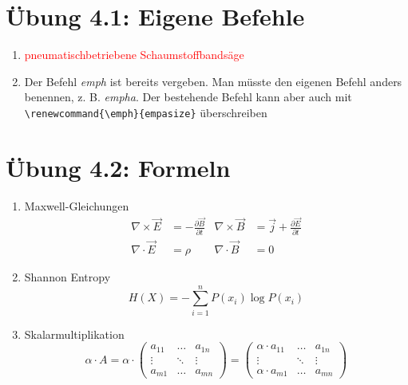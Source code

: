 \documentclass{article}
\newcommand\pbsb[1]{\textcolor{#1}{pneumatischbetriebene Schaumstoffbandsäge}}
\begin{document}
\section*{Übung 4.1: Eigene Befehle}
\begin{enumerate}[label=\alph*)]
    \item \pbsb{red}
    \item Der Befehl \emph{emph} ist bereits vergeben.
          Man müsste den eigenen Befehl anders benennen, z. B. \emph{empha}.
          Der bestehende Befehl kann aber auch mit \texttt{\textbackslash{}renewcommand\{\textbackslash{}emph\}\{empasize\}} überschreiben
\end{enumerate}

\section*{Übung 4.2: Formeln}
\begin{enumerate}[label=\alph*)]
    \item Maxwell-Gleichungen
          \begin{align}
              \nabla \times \vec{E} & = - \frac{\partial \vec{B}}{\partial t}         &
              \nabla \times \vec{B} & = \vec{j} + \frac{\partial \vec{E}}{\partial t}   \\
              \nabla \cdot \vec{E}  & = \rho                                          &
              \nabla \cdot \vec{B}  & = 0
          \end{align}

    \item Shannon Entropy
          \begin{displaymath}
              H(X) = - \sum^{n}_{i=1}{P}(x_i) \log P(x_i)
          \end{displaymath}

    \item Skalarmultiplikation
          \begin{displaymath}
              \alpha \cdot A =
              \alpha \cdot \left(
              \begin{matrix}
                  a_{11} & \hdots & a_{1n} \\
                  \vdots & \ddots & \vdots \\
                  a_{m1} & \hdots & a_{mn}
              \end{matrix}
              \right) =
              \left(
              \begin{matrix}
                  \alpha \cdot a_{11} & \hdots & a_{1n} \\
                  \vdots              & \ddots & \vdots \\
                  \alpha \cdot a_{m1} & \hdots & a_{mn}
              \end{matrix}
              \right)
          \end{displaymath}
\end{enumerate}
\end{document}
